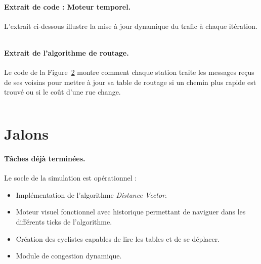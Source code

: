 \documentclass{article}
\begin{document}
\paragraph{Extrait de code : Moteur temporel.}
L'extrait ci-dessous illustre la mise à jour dynamique du trafic à chaque itération.
\begin{figure}[H]
\label{code:tick}
\hrulefill
\inputminted[breaklines, fontsize=\small, firstline=72, lastline=86 ]{python}{network.py}
\hrulefill
\end{figure}

\paragraph{Extrait de l'algorithme de routage.} Le code de la Figure~\ref{code:distance-vector} montre comment chaque station traite les messages reçus de ses voisins pour mettre à jour sa table de routage si un chemin plus rapide est trouvé ou si le coût d'une rue change.
\begin{figure}[H]
\label{code:distance-vector}
\hrulefill
\inputminted[breaklines, fontsize=\small, firstline=29, lastline=48]{python}{distance_vector.py}
\hrulefill
\end{figure}

\section{Jalons}

\paragraph{Tâches déjà terminées.}
Le socle de la simulation est opérationnel :
\begin{itemize}
    \item Implémentation de l'algorithme \textit{Distance Vector}.
    \item Moteur visuel fonctionnel avec historique permettant de naviguer dans les différents ticks de l'algorithme.
    \item Création des cyclistes capables de lire les tables et de se déplacer.
    \item Module de congestion dynamique.
\end{itemize}
\end{document}
